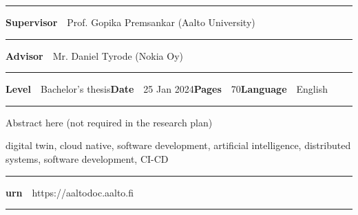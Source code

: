 \begin{spacing}{.88}
{\vspace{-2.4mm}\rule{\textwidth}{.75pt}

{\fontsize{10.5pt}{10.5pt}\bfseries\sffamily\lsstyle Supervisor}~~{\small Prof. Gopika Premsankar (Aalto University)}%

\vspace{-2.4mm}\rule{\textwidth}{.75pt}

{\fontsize{10.5pt}{10.5pt}\bfseries\sffamily\lsstyle Advisor}~~{\small Mr. Daniel Tyrode (Nokia Oy)}

\vspace{-2.4mm}\rule{\textwidth}{.75pt}

{\fontsize{10.5pt}{10.5pt}\bfseries\sffamily\lsstyle Level}~~{\small Bachelor's thesis}\hfill{\fontsize{10.5pt}{10.5pt}\bfseries\sffamily\lsstyle Date}~~{\small 25 Jan 2024}\hfill{\fontsize{10.5pt}{10.5pt}\bfseries\sffamily\lsstyle Pages}~~{\small 70}\hfill{\fontsize{10.5pt}{10.5pt}\bfseries\sffamily\lsstyle Language}~~{\small English}

\vspace{-2.4mm}\rule{\textwidth}{.75pt}

\vspace{6mm}

} %
\end{spacing}
\begin{spacing}{1.05}

\vspace{.8mm}

{\small
  Abstract here (not required in the research plan)
}

\vfill

\end{spacing}
\begin{spacing}{.88}
{\parindent0pt %

\parbox[t]{123.6mm}{\raggedright\small digital twin, cloud native, software development, artificial intelligence, distributed systems, software development, CI-CD}

\vspace{.5mm}\rule{\textwidth}{.75pt}

{\fontsize{10.5pt}{10.5pt}\bfseries\sffamily\lsstyle urn}~~{\small https://aaltodoc.aalto.fi}

\vspace{-2.4mm}\rule{\textwidth}{.75pt}

} %
\end{spacing}



